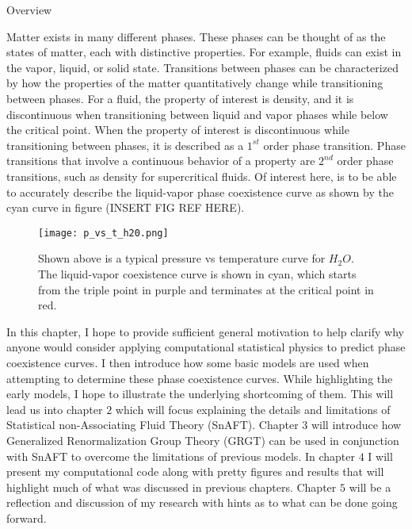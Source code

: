 \begin{section}{Overview}

Matter exists in many different phases.  These phases can be thought of as the states of matter, each with distinctive properties.  For example, fluids can exist in the vapor, liquid, or solid state.  Transitions between phases can be characterized by how the properties of the matter quantitatively change while transitioning between phases.  For a fluid, the property of interest is density, and it is discontinuous when transitioning between liquid and vapor phases while below the critical point.  When the property of interest is discontinuous while transitioning between phases, it is described as a $1^{st}$ order phase transition.  Phase transitions that involve a continuous behavior of a property are $2^{nd}$ order phase transitions, such as density for supercritical fluids.  Of interest here, is to be able to accurately describe the liquid-vapor phase coexistence curve as shown by the cyan curve in figure (INSERT FIG REF HERE).  


\begin{figure}[H]
	\centering
	\texttt{[image: p\_vs\_t\_h20.png]}
	\caption{Shown above is a typical pressure vs temperature curve for $H_2O$.  The liquid-vapor coexistence curve is shown in cyan, which starts from the triple point in purple and terminates at the critical point in red. }
	\label{fig:p_vs_t_h20}
\end{figure}


In this chapter, I hope to provide sufficient general motivation to help clarify why anyone would consider applying computational statistical physics to predict phase coexistence curves.  I then introduce how some basic models are used when attempting to determine these phase coexistence curves.  While highlighting the early models, I hope to illustrate the underlying shortcoming of them.  This will lead us into chapter $2$ which will focus explaining the details and limitations of Statistical non-Associating Fluid Theory (SnAFT).  Chapter $3$ will introduce how Generalized Renormalization Group Theory (GRGT) can be used in conjunction with SnAFT to overcome the limitations of previous models.  In chapter $4$ I will present my computational code along with pretty figures and results that will highlight much of what was discussed in previous chapters.  Chapter $5$ will be a reflection and discussion of my research with hints as to what can be done going forward.

\end{section}


